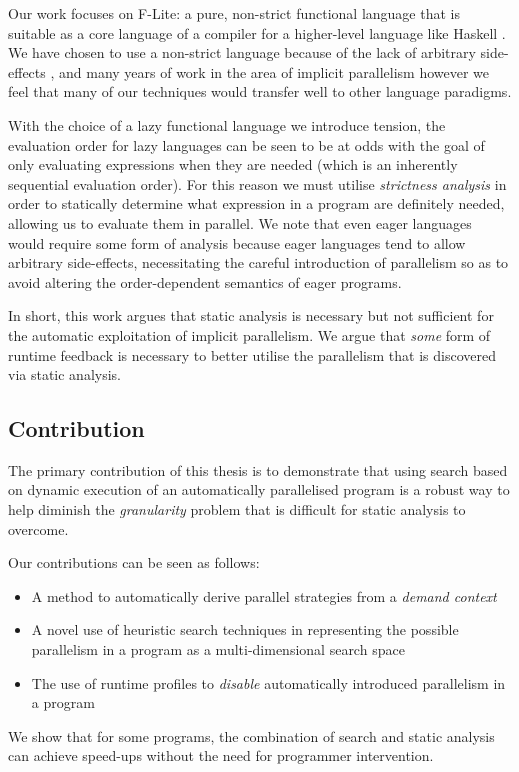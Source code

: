 Our work focuses on F-Lite: a pure, non-strict functional language that is
suitable as a core language of a compiler for a higher-level language like
Haskell \citep{naylor2010reduceron}. We have chosen to use a non-strict language
because of the lack of arbitrary side-effects \citep{whyFPmatters}, and many
years of work in the area of implicit parallelism \citep{hogen1992automatic,
PFPAnIntro, jones1993implicit} however we feel that many of our techniques
would transfer well to other language paradigms.

With the choice of a lazy functional language we introduce tension, the
evaluation order for lazy languages can be seen to be at odds with the goal of
only evaluating expressions when they are needed (which is an inherently
sequential evaluation order). For this reason we must utilise \emph{strictness
analysis} in order to statically determine what expression in a program are
definitely needed, allowing us to evaluate them in parallel. We note that even
eager languages would require some form of analysis because eager languages
tend to allow arbitrary side-effects, necessitating the careful introduction of
parallelism so as to avoid altering the order-dependent semantics of eager
programs.

In short, this work argues that static analysis is necessary but not sufficient
for the automatic exploitation of implicit parallelism. We argue that
\emph{some} form of runtime feedback is necessary to better utilise the
parallelism that is discovered via static analysis.

\subsection{Contribution}

The primary contribution of this thesis is to demonstrate that using search
based on dynamic execution of an automatically parallelised program is a robust
way to help diminish the \emph{granularity} problem that is difficult for
static analysis to overcome.

Our contributions can be seen as follows:

\begin{itemize}
    \item A method to automatically derive parallel strategies from a
            \emph{demand context}
    \item A novel use of heuristic search techniques in representing the
            possible parallelism in a program as a multi-dimensional search space
    \item The use of runtime profiles to \emph{disable} automatically introduced
            parallelism in a program
\end{itemize}

We show that for some programs, the combination of
search and static analysis can achieve speed-ups without the need for
programmer intervention.

